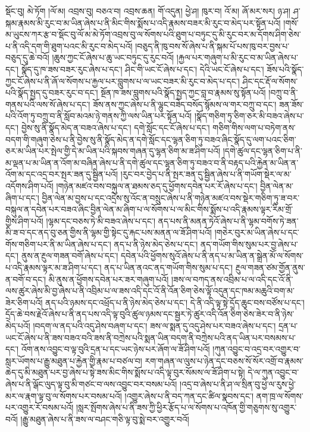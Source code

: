 སྡོང་བུ། མེ་ཏོག །ལོ་མ། འབྲས་བུ། བཅའ་བ། འབྲས་ཆན། གོ་འདུན། ཕྱེ་ཤ། ཁུར་བ། འོ་མ། ཞོ་མར་སར། ཉ་ཤ། ཤ་སྐམ་རྣམས་མི་རུང་བ་མ་ཡིན་ཞེས་པ་ནི་མིང་གིས་སྨོས་པ་འདི་རྣམས་བཟར་མི་རུང་བ་མེད་པར་སྟོན་པའོ། །གསོ་མ་ཡུངས་ཀར་རྩ་བ་སྡོང་བུ་ལོ་མ་མེ་ཏོག་འབྲས་བུ་ལ་སོགས་པའི་ཐུག་པ་བཏུང་དུ་མི་རུང་བར་མ་དོགས་ཤིག་ཅེས་པ་ནི་འདི་དག་གི་ཐུག་པའང་མི་རུང་བ་མེད་པའོ། །བཅུད་ནི་ཁུ་བས་སོ་ཞེས་པ་ནི་སྐམ་པོ་པས་ཁུ་བར་བྱས་པ་བཅུད་དུ་ཆེ་བའོ། །ཆུས་ཀྱང་ངོ་ཞེས་པ་ཆུ་ཡང་བཏུང་དུ་རུང་བའོ། །རྐྱལ་པར་གཞུག་པ་མི་རུང་བ་མ་ཡིན་ཞེས་པ་དང་། སྣོད་དུ་ཁ་ཟས་བཟར་རུང་ཞེས་པ་དང་། ཤིང་གི་ཡང་ངོ་ཞེས་པ་དང་། དེའི་ཡང་ངོ་ཞེས་པ་དང་། ཟོས་པའི་སྣོད་ཀྱང་ངོ་ཞེས་པ་ནི་ཞོ་ལ་སོགས་པ་རྐྱལ་པར་བླུགས་པ་ལ་ཡང་བཟར་མི་རུང་བ་མེད་པ་དང་། ཤིང་དང་རྡོ་ལ་སོགས་པའི་སྣོད་སྤྱད་དུ་བཟར་རུང་བ་དང་། སྔོན་ཁ་ཟས་བླུགས་པའི་སྣོད་སྤྱད་ཀྱང་བླ་བ་རྣམས་སུ་སྟོན་པའོ། །བཀྲུ་བ་ནི་གནས་པའི་ལས་སོ་ཞེས་པ་དང་། ཟོས་ནས་ཀྱང་ཞེས་པ་ནི་ལྷུང་བཟེད་བསོད་སྙོམས་ལ་གར་བཀྲུ་བ་དང་། ཟན་ཟོས་པའི་འོག་ཏུ་བཀྲུ་བ་ནི་སློབ་མའམ་ཉེ་གནས་ཀྱི་ལས་ཡིན་པར་སྟོན་པའོ། །སྣོད་གཅིག་ཏུ་ཅིག་ཅར་མི་བཟའ་ཞེས་པ་དང་། བྱེས་སུ་ནི་སྣོད་མེད་ན་བཟའ་ཞེས་པ་དང་། དགེ་སློང་དང་ངོ་ཞེས་པ་དང་། གཅིག་གིས་ལག་པ་བཏེག་ནས་བདག་གི་གཞུག་ཅེས་པ་ནི་བྱེས་སུ་ནི་སྣོད་མེད་ན་དགེ་སློང་དང་ལྷན་ཅིག་ཏུ་བཟའ་ཞིང་སྣོད་དུ་ལག་པའང་ཅིག་ཅར་མ་ཡིན་པར་སྤེལ་གྱི་དེ་མ་ཡིན་པའི་སྐབས་གཞན་དུ་ལྷན་ཅིག་མ་ཟ་ཤིག་པའོ། །དགེ་ཚུལ་དང་ལྷན་ཅིག་པ་ནི་མ་ལྡན་པ་མ་ཡིན་ན་འོག་མ་བཞིན་ཞེས་པ་ནི་དགེ་ཚུལ་དང་ལྷན་ཅིག་ཏུ་བཟའ་བ་ནི་བརྟད་པའི་རྐྱེན་མ་ཡིན་ན་འོག་མ་དང་འདྲ་བར་སྤར་ཟན་དུ་སྦྱིན་པའོ། །རུང་བར་བྱེད་པ་ནི་སྤར་ཟན་དུ་སྦྱིན་ཞེས་པ་ནི་གཡོག་སྡེར་ལ་མ་འདོགས་ཤིག་པའོ། །གཉེན་མཛའ་བས་བསྐུལ་ན་ཐམས་ཅད་དུ་ཕྱོགས་དབེན་པར་རོ་ཞེས་པ་དང་། བྱིན་ལེན་མ་ཞིག་པ་དང་། བྱིན་ལེན་མ་བྱས་པ་དང་འདྲེས་སུ་འོང་ན་བསྲུང་ཞེས་པ་ནི་གཉེན་མཛའ་བས་སྡེར་གཅིག་ཏུ་ཟ་བར་བསྐུལ་ན་དབེན་པར་བཟའ་ཞིང་བྱིན་ལེན་མ་ཞིག་པ་ལ་སོགས་པ་ལ་མིང་གིས་སྨོས་པ་འདི་རྣམས་ལྟར་རིམ་གྲོ་གྱིས་ཤིག་པའོ། །ལྷམ་དང་བཅས་ཏེ་མི་བཟའ་ཞེས་པ་དང་། ནད་པས་ནི་མནན་ཏེའོ་ཞེས་པ་ནི་ལྷམ་བགོས་ཏེ་ཟན་མི་ཟ་བ་དང་ནད་བུ་ཅན་གྱིས་ནི་ལྷམ་གྱི་སྟེང་དུ་རྐང་པས་མནན་ལ་ཟོ་ཤིག་པའོ། །གཅེར་བུར་མ་ཡིན་ཞེས་པ་དང་གོས་གཅིག་པར་ནི་མ་ཡིན་ཞེས་པ་དང་། ནད་པ་ནི་ཉེས་མེད་ཅེས་པ་དང་། ནད་གཡོག་གིས་སུམ་པར་བྱ་ཞེས་པ་དང་། ནུས་ན་རྔུལ་གཟན་བགོ་ཞེས་པ་དང་། དབེན་པའི་ཕྱོགས་སུའོ་ཞེས་པ་ནི་ནད་པ་མ་ཡིན་ན་སྒྲེན་མོ་ལ་སོགས་པ་འདི་རྣམས་ལྟར་མ་ཟ་ཤིག་པ་དང་། ནད་པ་ཡིན་ནའང་ནད་གཡོག་གིས་སུམ་པ་དང་། རྔུལ་གཟན་ཙམ་གྱོན་ནུས་ན་བགོ་བ་དང་། མི་ནུས་ན་ཕྱོགས་དབེན་པར་ཟར་གཞུག་པའོ། །ཟས་ལ་བཀད་ནས་འབྲིམ་པ་ལ་འདི་དང་འོ་ནི་ལས་ཚུར་ཞེས་མི་བྱ་ཞེས་པ་ནི་འབྲིམ་པ་ལ་ཟས་འདི་དང་འོ་ནི་འོན་ཅིག་ཅེས་ལྟོ་འདུན་དང་ཁམ་མཆུའི་བག་མ་ཟེར་ཅིག་པའོ། ནད་པའི་ཉམས་དང་འཕྲོད་པ་ནི་ཉེས་མེད་ཅེས་པ་དང་། དེ་ནི་འདི་ལྟ་སྟེ་དྲོད་ཆུང་བས་བཙོས་པ་དང་། དྲོད་ཆེ་བས་རྗེའོ་ཞེས་པ་ནི་ནད་པས་འདི་ལྟ་བུའི་ཚུལ་ཉམས་དང་སྦྱར་ཏེ་ཚུར་འདི་འོན་ཅིག་ཅེས་ཟེར་བ་ནི་ཉེས་མེད་པའོ། །བདག་ལ་ནད་པའི་འདུ་ཤེས་བཞག་པ་དང་། ཟས་ལ་སྨན་དུ་འདུ་ཤེས་པར་བཟའ་ཞེས་པ་དང་། དྲན་པ་ཡང་ངོ་ཞེས་པ་ནི་ཟས་བཟའ་བའི་ཟས་ནི་བཀྲེས་པའི་སྨན་ཡིན་བདག་ནི་བཀྲེས་པའི་ནད་ཡིན་པར་བསམས་པ་དང་། འོག་ནས་འབྱུང་བ་ལྟ་བུའི་དྲན་པ་དང་ཡང་ཉེས་པར་ཞོག་ལ་ཟོ་ཤིག་པའོ། །ཀུན་འབྱུང་བ་འདྲ་བར་འགྱུར་བ་སླར་ཡོགས་པ་རྒྱུ་མཐུན་པ་རྐྱེན་གྱི་རྣམ་པ་བཙལ་བ། རག་གཞན་ལ་ལུས་པ་ཉེན་དང་བཅས་སོ་སོར་འགྲོ་བ་རྣམས་ཆེད་དུ་མི་མཐུན་པར་བྱ་ཞེས་པ་སྟེ་ཟས་མིང་གིས་སྨོས་པ་འདི་ལྟ་བུར་སོམས་ལ་ཟོ་ཤིག་པ་སྟེ། དེ་ལ་ཀུན་འབྱུང་བ་ཞེས་པ་ནི་ལྒོང་ལུད་ལྟ་བུ་མི་གཙང་བ་ལས་འབྱུང་བར་བསམ་པའོ། །འདྲ་བ་ཞེས་པ་ནི་ཤ་ལ་སྲིན་བུ་ཕྱེ་ལ་རུས་ཕྱེ་མར་ལ་རྣག་ལྟ་བུ་ལ་སོགས་པར་བསམ་པའོ། །འགྱུར་ཞེས་པ་ནི་བད་ཀན་དང་ཚིལ་སྣབས་དང་། ནག་ཁྲ་ལ་སོགས་པར་འགྱུར་རོ་བསམ་པའོ། །སླར་སྤོགས་ཞེས་པ་ནི་ཟས་ཀྱི་ཕྱིར་རྩོད་པ་ལ་སོགས་པ་འཁོན་གྱི་གཅུགས་སུ་འགྱུར་བའོ། །རྒྱུ་མཐུན་ཞེས་པ་ནི་ཟས་ལ་བཤང་གཅི་ལྟ་བུ་སྨེ་བར་འགྱུར་བའོ། 